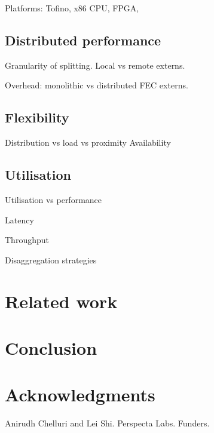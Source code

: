 \documentclass[letterpaper,twocolumn,10pt]{article}
\begin{document}
Platforms:
Tofino,
x86 CPU,
FPGA,


\subsection{Distributed performance}
Granularity of splitting. Local vs remote externs.

Overhead: monolithic vs distributed FEC externs.

\subsection{Flexibility}
Distribution vs load vs proximity
Availability

\subsection{Utilisation}
Utilisation vs performance

Latency

Throughput

Disaggregation strategies


\section{Related work}
%
%


\section{Conclusion}


\section{Acknowledgments}
Anirudh Chelluri and Lei Shi.
Perspecta Labs.
Funders.

%
%
%
%
%

{\footnotesize 
}

\theendnotes
\end{document}
